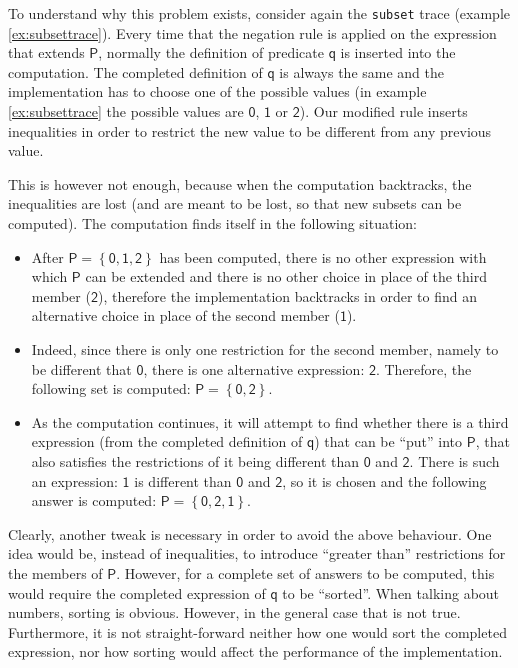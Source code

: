 \documentclass[inscr,ack,preface]{dithesis}
\theoremstyle{definition}
\newcommand{\msf}[1]{$\mathsf{#1}$}
\begin{document}
To understand why this problem exists, consider again the \texttt{subset} trace (example \ref{ex:subsettrace}). Every time that the negation rule is applied on the expression that extends \msf{P}, normally the definition of predicate \msf{q} is inserted into the computation. The completed definition of \msf{q} is always the same and the implementation has to choose one of the possible values (in example \ref{ex:subsettrace} the possible values are \msf{0}, \msf{1} or \msf{2}). Our modified rule inserts inequalities in order to restrict the new value to be different from any previous value.

This is however not enough, because when the computation backtracks, the inequalities are lost (and are meant to be lost, so that new subsets can be computed). The computation finds itself in the following situation:

\begin{itemize}
\item After \msf{P = \left\{ 0, 1, 2 \right\}} has been computed, there is no other expression with which \msf{P} can be extended and there is no other choice in place of the third member (\msf{2}), therefore the implementation backtracks in order to find an alternative choice in place of the second member (\msf{1}).
\item Indeed, since there is only one restriction for the second member, namely to be different that \msf{0}, there is one alternative expression: \msf{2}. Therefore, the following set is computed: \msf{P = \left\{ 0, 2 \right\}}.
\item As the computation continues, it will attempt to find whether there is a third expression (from the completed definition of \msf{q}) that can be ``put'' into \msf{P}, that also satisfies the restrictions of it being different than \msf{0} and \msf{2}. There is such an expression: \msf{1} is different than \msf{0} and \msf{2}, so it is chosen and the following answer is computed: \msf{P = \left\{ 0, 2, 1 \right\}}.
\end{itemize}

Clearly, another tweak is necessary in order to avoid the above behaviour. One idea would be, instead of inequalities, to introduce ``greater than'' restrictions for the members of \msf{P}. However, for a complete set of answers to be computed, this would require the completed expression of \msf{q} to be ``sorted''. When talking about numbers, sorting is obvious. However, in the general case that is not true. Furthermore, it is not straight-forward neither how one would sort the completed expression, nor how sorting would affect the performance of the implementation.
\end{document}
